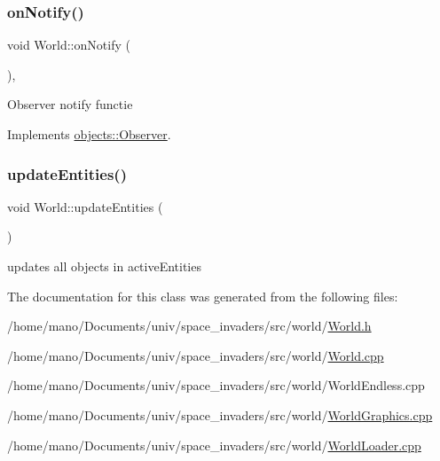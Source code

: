 \subsubsection{\texorpdfstring{on\+Notify()}{onNotify()}}
{\footnotesize\ttfamily void World\+::on\+Notify (\begin{DoxyParamCaption}{ }\end{DoxyParamCaption})\hspace{0.3cm}{\ttfamily [override]}, {\ttfamily [virtual]}}

Observer notify functie 

Implements \hyperlink{classobjects_1_1Observer_a08db257ca01702390b6e39b68a0dfea5}{objects\+::\+Observer}.

\mbox{\label{classWorld_a5cc73b1aa54db5da01e4004acd4fd8bb}} 
\subsubsection{\texorpdfstring{update\+Entities()}{updateEntities()}}
{\footnotesize\ttfamily void World\+::update\+Entities (\begin{DoxyParamCaption}{ }\end{DoxyParamCaption})}

updates all objects in active\+Entities 

The documentation for this class was generated from the following files\+:\begin{DoxyCompactItemize}
\item 
/home/mano/\+Documents/univ/space\+\_\+invaders/src/world/\hyperlink{World_8h}{World.\+h}\item 
/home/mano/\+Documents/univ/space\+\_\+invaders/src/world/\hyperlink{World_8cpp}{World.\+cpp}\item 
/home/mano/\+Documents/univ/space\+\_\+invaders/src/world/World\+Endless.\+cpp\item 
/home/mano/\+Documents/univ/space\+\_\+invaders/src/world/\hyperlink{WorldGraphics_8cpp}{World\+Graphics.\+cpp}\item 
/home/mano/\+Documents/univ/space\+\_\+invaders/src/world/\hyperlink{WorldLoader_8cpp}{World\+Loader.\+cpp}\end{DoxyCompactItemize}
